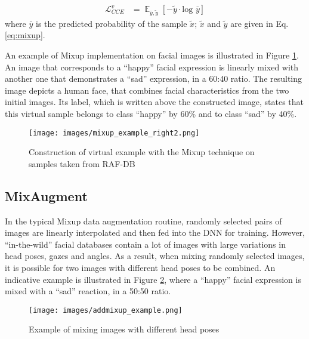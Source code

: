 \documentclass[10pt,twocolumn,letterpaper]{article}
\begin{document}
\begin{align}
\mathcal{L}_{CCE}^{v} &=  \mathop{ \mathbb{E}}_{ \bar{y},\tilde{y}}[- \tilde{y} \cdot \text{log } \bar{y} ]   \label{eq:cce}
\end{align}
where  $\bar{y}$  is the predicted probability of the sample $\tilde{x}$; $\tilde{x}$ and $\tilde{y}$ are given in Eq. \ref{eq:mixup}.



An example of Mixup implementation on facial images is illustrated in Figure \ref{fig:mixup}. An image that corresponds to a \enquote{happy} facial expression is linearly mixed with another one that demonstrates a \enquote{sad} expression, in a 60:40 ratio. The resulting image depicts a human face, that combines facial characteristics from the two initial images. Its label, which is written above the constructed image, states that this virtual sample belongs to class \enquote{happy} by 60\% and to class \enquote{sad} by 40\%. 

\begin{figure}[h!]
  \centering
 \texttt{[image: images/mixup\_example\_right2.png]}
 \caption{Construction of virtual example with the Mixup technique on samples taken from RAF-DB}
 \label{fig:mixup}
\end{figure}


\subsection{MixAugment}


In the typical Mixup data augmentation routine, randomly selected pairs of images are linearly interpolated and then fed into the DNN for training. However, \enquote{in-the-wild} facial databases contain a lot of images with large variations in head poses, gazes and angles. As a result, when mixing randomly selected images, it is possible for two images with different head poses to be combined. An indicative example is illustrated in Figure \ref{fig:MixAugment}, where a \enquote{happy} facial expression is mixed with a \enquote{sad} reaction, in a 50:50 ratio.

\begin{figure}[h!]
  \centering
 \texttt{[image: images/addmixup\_example.png]}
 \caption{Example of mixing images with different head poses}
 \label{fig:MixAugment}
\end{figure}
\end{document}
